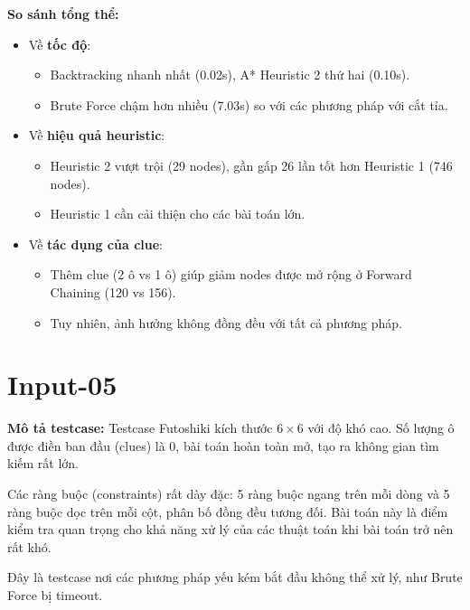 \textbf{So sánh tổng thể:}

\begin{itemize}
    \item Về \textbf{tốc độ}:
    \begin{itemize}
        \item Backtracking nhanh nhất (0.02s), A* Heuristic 2 thứ hai (0.10s).
        \item Brute Force chậm hơn nhiều (7.03s) so với các phương pháp với cắt tỉa.
    \end{itemize}
    
    \item Về \textbf{hiệu quả heuristic}:
    \begin{itemize}
        \item Heuristic 2 vượt trội (29 nodes), gần gấp 26 lần tốt hơn Heuristic 1 (746 nodes).
        \item Heuristic 1 cần cải thiện cho các bài toán lớn.
    \end{itemize}
    
    \item Về \textbf{tác dụng của clue}:
    \begin{itemize}
        \item Thêm clue (2 ô vs 1 ô) giúp giảm nodes được mở rộng ở Forward Chaining (120 vs 156).
        \item Tuy nhiên, ảnh hưởng không đồng đều với tất cả phương pháp.
    \end{itemize}
\end{itemize}


\section{Input-05}
\textbf{Mô tả testcase:}
Testcase Futoshiki kích thước $6 \times 6$ với độ khó cao. Số lượng ô được điền ban đầu (clues) là 0, bài toán hoàn toàn mở, tạo ra không gian tìm kiếm rất lớn.

Các ràng buộc (constraints) rất dày đặc: 5 ràng buộc ngang trên mỗi dòng và 5 ràng buộc dọc trên mỗi cột, phân bố đồng đều tương đối. Bài toán này là điểm kiểm tra quan trọng cho khả năng xử lý của các thuật toán khi bài toán trở nên rất khó.

Đây là testcase nơi các phương pháp yếu kém bắt đầu không thể xử lý, như Brute Force bị timeout.

